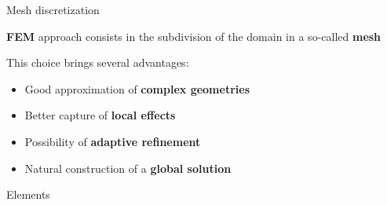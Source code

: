 \documentclass[10pt,externalviewer]{beamer}
\begin{document}
\begin{frame}{Mesh discretization}
   \begin{center}
      \begin{framed}
         \textbf{FEM} approach consists in the subdivision of the domain in a so-called \textbf{\textcolor{BrickRed}{mesh}}
      \end{framed}
   \end{center}

   \pause

   This choice brings several advantages:

   \begin{itemize}
      \item Good approximation of \textbf{complex geometries}
      \item Better capture of \textbf{local effects}
      \item Possibility of \textbf{adaptive refinement}
      \item Natural construction of a \textbf{global solution}
   \end{itemize}

\end{frame}

\begin{frame}{Elements}
   
\end{frame}
\end{document}
